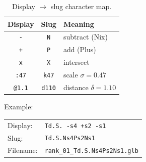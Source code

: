\documentclass[11pt, a4paper]{article}
\newcommand{\code}[1]{\texttt{#1}}
\begin{document}
\begin{table}[h]
\centering
\caption{Display $\to$ slug character map.}
\label{tab:slugmap}
\begin{tabular}{ccl}
\toprule
Display & Slug & Meaning \\
\midrule
\code{-} & \code{N} & subtract (Nix) \\
\code{+} & \code{P} & add (Plus) \\
\code{x} & \code{X} & intersect \\
\code{:47} & \code{k47} & scale $\sigma = 0.47$ \\
\code{@1.1} & \code{d110} & distance $\delta = 1.10$ \\
\bottomrule
\end{tabular}
\end{table}

\noindent Example:

\medskip
\begin{tabular}{ll}
Display: & \code{Td.S. -s4 +s2 -s1} \\
Slug:    & \code{Td.S.Ns4Ps2Ns1} \\
Filename: & \code{rank\_01\_Td.S.Ns4Ps2Ns1.glb} \\
\end{tabular}
\end{document}
